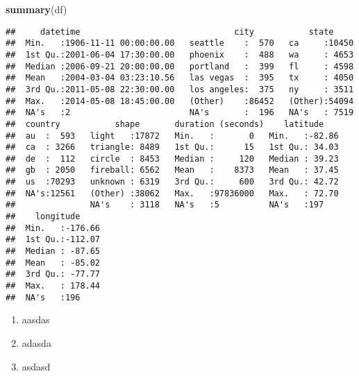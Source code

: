 \documentclass[
]{article}
\newenvironment{Shaded}{\begin{snugshade}}{\end{snugshade}}
\newcommand{\FunctionTok}[1]{\textcolor[rgb]{0.13,0.29,0.53}{\textbf{#1}}}
\newcommand{\NormalTok}[1]{#1}
\providecommand{\tightlist}{%
  \setlength{\itemsep}{0pt}\setlength{\parskip}{0pt}}
\begin{document}
\begin{Shaded}
\begin{Highlighting}[]
\FunctionTok{summary}\NormalTok{(df)}
\end{Highlighting}
\end{Shaded}

\begin{verbatim}
##     datetime                               city           state      
##  Min.   :1906-11-11 00:00:00.00   seattle    :  570   ca     :10450  
##  1st Qu.:2001-06-04 17:30:00.00   phoenix    :  488   wa     : 4653  
##  Median :2006-09-21 20:00:00.00   portland   :  399   fl     : 4598  
##  Mean   :2004-03-04 03:23:10.56   las vegas  :  395   tx     : 4050  
##  3rd Qu.:2011-05-08 22:30:00.00   los angeles:  375   ny     : 3511  
##  Max.   :2014-05-08 18:45:00.00   (Other)    :86452   (Other):54094  
##  NA's   :2                        NA's       :  196   NA's   : 7519  
##  country           shape       duration (seconds)    latitude     
##  au  :  593   light   :17872   Min.   :       0   Min.   :-82.86  
##  ca  : 3266   triangle: 8489   1st Qu.:      15   1st Qu.: 34.03  
##  de  :  112   circle  : 8453   Median :     120   Median : 39.23  
##  gb  : 2050   fireball: 6562   Mean   :    8373   Mean   : 37.45  
##  us  :70293   unknown : 6319   3rd Qu.:     600   3rd Qu.: 42.72  
##  NA's:12561   (Other) :38062   Max.   :97836000   Max.   : 72.70  
##               NA's    : 3118   NA's   :5          NA's   :197     
##    longitude      
##  Min.   :-176.66  
##  1st Qu.:-112.07  
##  Median : -87.65  
##  Mean   : -85.02  
##  3rd Qu.: -77.77  
##  Max.   : 178.44  
##  NA's   :196
\end{verbatim}

\begin{enumerate}
\def\labelenumi{\arabic{enumi}.}
\tightlist
\item
  aasdas
\item
  adasda
\item
  asdasd
\end{enumerate}
\end{document}
